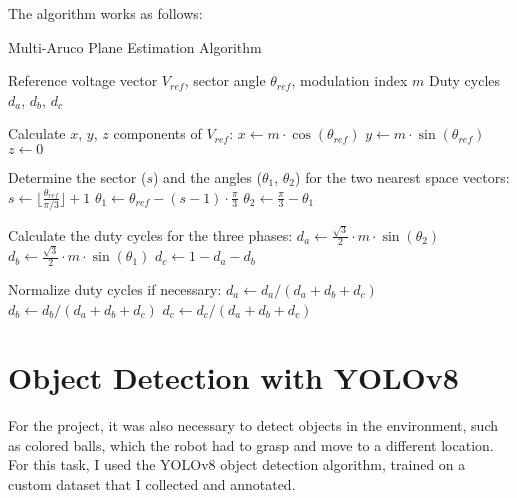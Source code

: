 The algorithm works as follows:
\begin{algorithm}[H]
    \caption{Multi-Aruco Plane Estimation Algorithm}
    \label{alg:multi_aruco}
    \begin{algorithmic}[1]
    
    \REQUIRE Reference voltage vector $V_{ref}$, sector angle $\theta_{ref}$, modulation index $m$
    \ENSURE Duty cycles $d_a$, $d_b$, $d_c$
    
    \STATE Calculate $x$, $y$, $z$ components of $V_{ref}$:
    \STATE $x \gets m \cdot \cos(\theta_{ref})$
    \STATE $y \gets m \cdot \sin(\theta_{ref})$
    \STATE $z \gets 0$
    
    \STATE Determine the sector ($s$) and the angles ($\theta_1$, $\theta_2$) for the two nearest space vectors:
    \STATE $s \gets \lfloor \frac{\theta_{ref}}{\pi/3} \rfloor + 1$
    \STATE $\theta_1 \gets \theta_{ref} - (s-1) \cdot \frac{\pi}{3}$
    \STATE $\theta_2 \gets \frac{\pi}{3} - \theta_1$
    
    \STATE Calculate the duty cycles for the three phases:
    \STATE $d_a \gets \frac{\sqrt{3}}{2} \cdot m \cdot \sin(\theta_2)$
    \STATE $d_b \gets \frac{\sqrt{3}}{2} \cdot m \cdot \sin(\theta_1)$
    \STATE $d_c \gets 1 - d_a - d_b$
    
    \STATE Normalize duty cycles if necessary:
        \STATE $d_a \gets d_a / (d_a + d_b + d_c)$
        \STATE $d_b \gets d_b / (d_a + d_b + d_c)$
        \STATE $d_c \gets d_c / (d_a + d_b + d_c)$
    \ENDIF
    
    \end{algorithmic}
\end{algorithm}

\section{Object Detection with YOLOv8}

For the project, it was also necessary to detect objects in the environment, such as colored balls, which the robot
had to grasp and move to a different location. For this task, I used the YOLOv8 object detection algorithm, trained
on a custom dataset that I collected and annotated.

